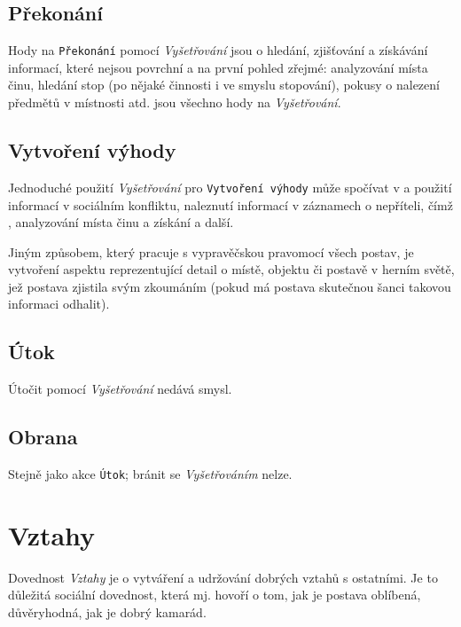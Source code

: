 \documentclass[../main.tex]{subfiles}
\begin{document}
\subsection*{Překonání}
\label{subsec:vysetrovani-prekonani}
\prekonani

Hody na \texttt{Překonání} pomocí \textit{Vyšetřování} jsou o hledání, zjišťování a získávání informací, které nejsou povrchní a na první pohled zřejmé: analyzování místa činu, hledání stop (po nějaké činnosti i ve smyslu stopování), pokusy o nalezení předmětů v místnosti atd. jsou všechno hody na \textit{Vyšetřování}.

\subsection*{Vytvoření výhody}
\label{subsec:vysetrovani-vytvoreni}
\vytvoreni

Jednoduché použití \textit{Vyšetřování} pro \texttt{Vytvoření výhody} může spočívat v  a použití informací v sociálním konfliktu, naleznutí informací v záznamech o nepříteli, čímž , analyzování místa činu a získání  a další.

Jiným způsobem, který pracuje s vypravěčskou pravomocí všech postav, je vytvoření aspektu reprezentující detail o místě, objektu či postavě v herním světě, jež postava zjistila svým zkoumáním (pokud má postava skutečnou šanci takovou informaci odhalit).

\subsection*{Útok}
\label{subsec:vysetrovani-utok}
\utok


Útočit pomocí \textit{Vyšetřování} nedává smysl.

\subsection*{Obrana}
\label{subsec:vysetrovani-obrana}
\obrana

Stejně jako akce \texttt{Útok}; bránit se \textit{Vyšetřováním} nelze.

\section{Vztahy}
\label{sec:vztahy}

Dovednost \textit{Vztahy} je o vytváření a udržování dobrých vztahů s ostatními. Je to důležitá sociální dovednost, která mj. hovoří o tom, jak je postava oblíbená, důvěryhodná, jak je dobrý kamarád.
\end{document}
